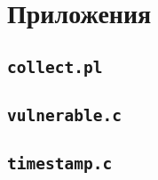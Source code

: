 \section{Приложения}

\subsection{ \texttt{collect.pl} }
\label{app:collect}


\subsection{ \texttt{vulnerable.c} }
\label{app:vuln}


\subsection{ \texttt{timestamp.c} }
\label{app:timestamp}


\clearpage
